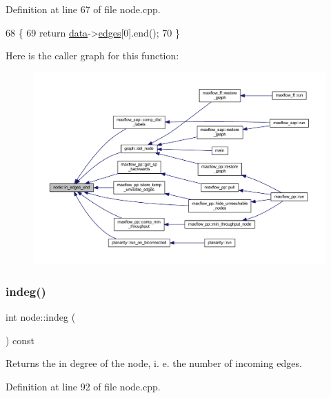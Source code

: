 Definition at line 67 of file node.\+cpp.


\begin{DoxyCode}
68 \{
69     \textcolor{keywordflow}{return} \mbox{\hyperlink{classnode_a4ae3d54ebb61be3a102bedf5b91bef75}{data}}->\mbox{\hyperlink{classnode__data_a91690d6d2594423c2cdf8ea083c8bd75}{edges}}[0].end();
70 \}
\end{DoxyCode}
Here is the caller graph for this function\+:\nopagebreak
\begin{figure}[H]
\begin{center}
\leavevmode
\includegraphics[width=350pt]{classnode_a785cd330f8b4c5c47d3b6e936a7e744e_icgraph}
\end{center}
\end{figure}
\mbox{\label{classnode_a749bfd1316584b96f8c9b0e44ad512f0}} 
\subsubsection{\texorpdfstring{indeg()}{indeg()}}
{\footnotesize\ttfamily int node\+::indeg (\begin{DoxyParamCaption}{ }\end{DoxyParamCaption}) const}

Returns the in degree of the node, i. e. the number of incoming edges. 

Definition at line 92 of file node.\+cpp.


